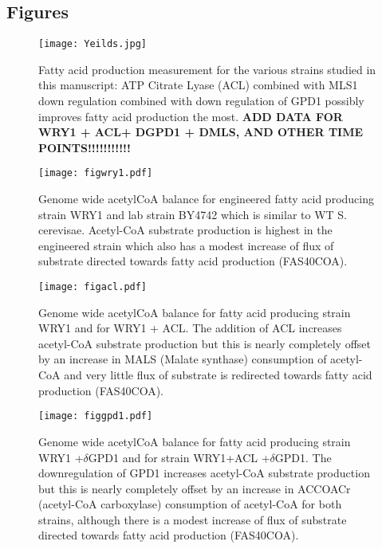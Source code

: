 \documentclass{bmcart}
\begin{document}
\begin{backmatter}

\section*{Figures}

\begin{figure}[h!]
\texttt{[image: Yeilds.jpg]}
\caption{
Fatty acid production measurement for the various strains studied in this manuscript: ATP Citrate Lyase (ACL) combined with MLS1 down regulation combined with down regulation of GPD1 possibly improves fatty acid production the most. \textbf{ ADD DATA FOR WRY1 + ACL+ DGPD1 + DMLS, AND OTHER TIME POINTS!!!!!!!!!!!}}
\label{fig:FAyields}
\end{figure}



\begin{figure}[h!]
\texttt{[image: figwry1.pdf]}
\caption{
Genome wide acetylCoA balance for engineered fatty acid producing strain WRY1 and lab strain BY4742 which is similar to WT S. cerevisae. Acetyl-CoA substrate production is highest in the engineered strain which also has a modest increase of flux of substrate directed towards fatty acid production (FAS40COA).}
\label{fig:wry1}
 \end{figure}




\begin{figure}[h!]
\texttt{[image: figacl.pdf]}
\caption{
Genome wide acetylCoA balance for fatty acid producing strain WRY1 and for WRY1 + ACL. The addition of ACL increases acetyl-CoA substrate production but this is nearly completely offset by an increase in MALS (Malate synthase) consumption of acetyl-CoA and very little flux of substrate is redirected towards fatty acid production (FAS40COA).}
\label{fig:ACL}
 \end{figure}


\begin{figure}[h!]
\texttt{[image: figgpd1.pdf]}
\caption{
Genome wide acetylCoA balance for fatty acid producing strain WRY1 +$\delta$GPD1 and for strain WRY1+ACL +$\delta$GPD1. The downregulation of GPD1 increases acetyl-CoA substrate production but this is nearly completely offset by an increase in ACCOACr (acetyl-CoA carboxylase) consumption of acetyl-CoA for both strains, although there is a modest increase of flux of substrate directed towards fatty acid production (FAS40COA).}
\label{fig:gdp1}
 \end{figure}




\end{backmatter}
\end{document}
